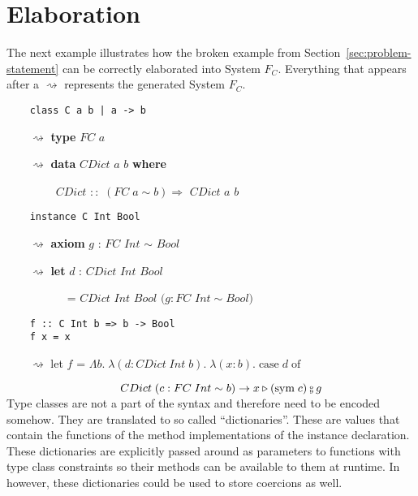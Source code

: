 \section{Elaboration}

The next example illustrates how the broken example from
Section~\ref{sec:problem-statement} can be correctly elaborated into System
$F_C$. Everything that appears after a $\rightsquigarrow$ represents the
generated System $F_C$.

\begin{verbatim}
    class C a b | a -> b
\end{verbatim}

$\qquad\rightsquigarrow$ \textbf{type} $FC$ $a$

$\qquad\rightsquigarrow$ \textbf{data} $CDict$ $a$ $b$ \textbf{where}

$\qquad\qquad$ $CDict$ $::$ $(FC \; a \sim b)
\Rightarrow$ $CDict$ $a$ $b$

\begin{verbatim}
    instance C Int Bool
\end{verbatim}

$\qquad\rightsquigarrow$ \textbf{axiom} $g$ : $FC$ $Int$ $\sim$ $Bool$

$\qquad\rightsquigarrow$ \textbf{let} $d$ : $CDict$ $Int$ $Bool$

$\qquad\qquad\quad$ = $CDict$ $Int$ $Bool$ $(g : FC$ $Int \sim Bool)$

\begin{verbatim}
    f :: C Int b => b -> Bool
    f x = x
\end{verbatim}

$\qquad\rightsquigarrow$ let $f$ = $\Lambda b. \; \lambda (d : CDict \; Int \;
b). \;\lambda (x : b). \; \text{case} \; d \; \text{of}$

$\hspace{3.5cm} CDict \; (c : FC \; Int \sim b ) \rightarrow x \triangleright
(\text{sym} \; c) \fctrans g$
\\

Type classes are not a part of the \systemfc syntax and therefore need to be
encoded somehow. They are translated to so called ``dictionaries''.  These are
values that contain the functions of the method implementations of the instance
declaration. These dictionaries are explicitly passed around as parameters to
functions with type class constraints so their methods can be available to them
at runtime. In \systemfc however, these dictionaries could be used to store
coercions as well.


